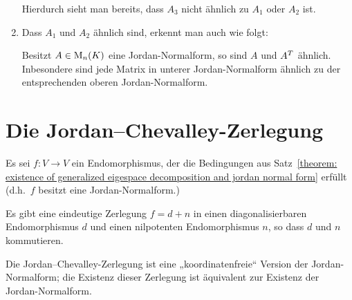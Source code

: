 \begin{example}
\begin{enumerate}
      Hierdurch sieht man bereits, dass $A_3$ nicht ähnlich zu $A_1$ oder $A_2$ ist.
      
    \item
      Dass $A_1$ und $A_2$ ähnlich sind, erkennt man auch wie folgt:
      
      Besitzt $A \in \operatorname{M}_{n}(K)$ eine Jordan-Normalform, so sind $A$ und $A^T$ ähnlich.
      Inbesondere sind jede Matrix in unterer Jordan-Normalform ähnlich zu der entsprechenden oberen Jordan-Normalform.
  \end{enumerate}
\end{example}





\section{Die Jordan--Chevalley-Zerlegung}

Es sei $f \colon V \to V$ ein Endomorphismus, der die Bedingungen aus Satz~\ref{theorem: existence of generalized eigespace decomposition and jordan normal form} erfüllt (d.h.\ $f$ besitzt eine Jordan-Normalform.)

\begin{proposition}
  Es gibt eine eindeutige Zerlegung $f = d + n$ in einen diagonalisierbaren Endomorphismus $d$ und einen nilpotenten Endomorphismus $n$, so dass $d$ und $n$ kommutieren.
\end{proposition}

Die Jordan--Chevalley-Zerlegung ist eine „koordinatenfreie“ Version der Jordan-Normalform;
die Existenz dieser Zerlegung ist äquivalent zur Existenz der Jordan-Normalform.

